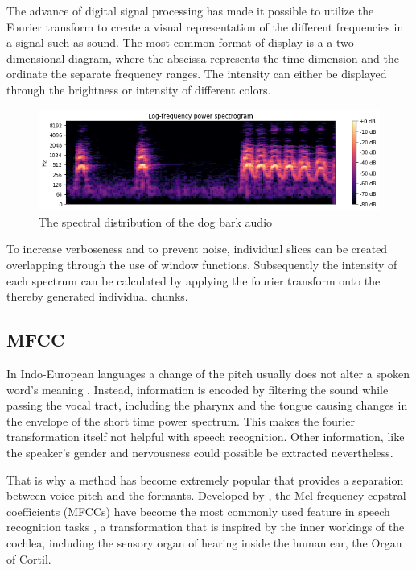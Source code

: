 The advance of digital signal processing has made it possible to utilize the Fourier transform to create a visual representation of the different frequencies in a signal such as sound. The most common format of display is a a two-dimensional diagram, where the abscissa represents the time dimension and the ordinate the separate frequency ranges. The intensity can either be displayed through the brightness or intensity of different colors. 

\begin{figure}[h]
    \centering
	\includegraphics[width=.9\textwidth]{./images/illustrations/spectrogram}
    \caption{The spectral distribution of the dog bark audio}
    \label{fig:spef}
\end{figure}

To increase verboseness and to prevent noise, individual slices can be created overlapping through the use of window functions. Subsequently the intensity of each spectrum can be calculated by applying the fourier transform onto the thereby generated individual chunks.


\subsection{MFCC}

In Indo-European languages a change of the pitch usually does not alter a spoken word’s meaning \cite{auditoryneuroscience}. Instead, information is encoded by filtering the sound while passing the vocal tract, including the pharynx and the tongue causing changes in the envelope of the short time power spectrum. This makes the fourier transformation itself not helpful with speech recognition. Other information, like the speaker's gender and nervousness could possible be extracted nevertheless.

That is why a method has become extremely popular that provides a separation between voice pitch and the formants. Developed by \cite{noll67}, the Mel-frequency cepstral coefficients (MFCCs) have become the most commonly used feature in speech recognition tasks \cite{ganchev2005comparative}, a transformation that is inspired by the inner workings of the cochlea, including the sensory organ of hearing inside the human ear, the Organ of Cortil. 

